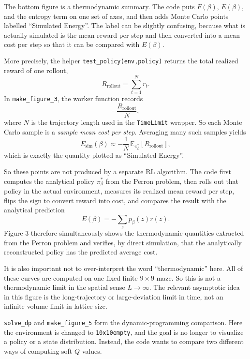 \documentclass[11pt]{article}
\begin{document}
The bottom figure is a thermodynamic summary. The code puts \(F(\beta)\), \(E(\beta)\), and the
entropy term on one set of axes, and then adds Monte Carlo points labelled ``Simulated
Energy''. The label can be slightly confusing, because what is actually simulated is the mean
reward per step and then converted into a mean cost per step so that it can be compared with
\(E(\beta)\).

More precisely, the helper \texttt{test\_policy(env,policy)} returns the total realized reward
of one rollout,
\begin{equation}
    R_{\mathrm{rollout}}=\sum_{t=1}^{N} r_t.
\end{equation}
In \texttt{make\_figure\_3}, the worker function records
\begin{equation}
    -\frac{R_{\mathrm{rollout}}}{N},
\end{equation}
where \(N\) is the trajectory length used in the \texttt{TimeLimit} wrapper. So each Monte
Carlo sample is a \emph{sample mean cost per step}. Averaging many such samples yields
\begin{equation}
    E_{\mathrm{sim}}(\beta)
    \approx
    -\frac{1}{N}\,\mathbb{E}_{\pi_\beta^*}[R_{\mathrm{rollout}}],
\end{equation}
which is exactly the quantity plotted as ``Simulated Energy''.

So these points are not produced by a separate RL algorithm. The code first computes the
analytical policy \(\pi^*_\beta\) from the Perron problem, then rolls out that policy in the
actual environment, measures its realized mean reward per step, flips the sign to convert
reward into cost, and compares the result with the analytical prediction
\begin{equation}
    E(\beta)=-\sum_z p_\beta(z)r(z).
\end{equation}
Figure 3 therefore simultaneously shows the thermodynamic quantities extracted from the Perron
problem and verifies, by direct simulation, that the analytically reconstructed policy has the
predicted average cost.

It is also important not to over-interpret the word ``thermodynamic'' here. All of these curves
are computed on one fixed finite \(9\times 9\) maze. So this is not a thermodynamic limit in
the spatial sense \(L\to\infty\). The relevant asymptotic idea in this figure is the
long-trajectory or large-deviation limit in time, not an infinite-volume limit in lattice size.

\medskip
\texttt{solve\_dp} and \texttt{make\_figure\_5} form the dynamic-programming comparison. Here
the environment is changed to \texttt{10x10empty}, and the goal is no longer to visualize a
policy or a state distribution. Instead, the code wants to compare two different ways of
computing soft \(Q\)-values.
\end{document}
